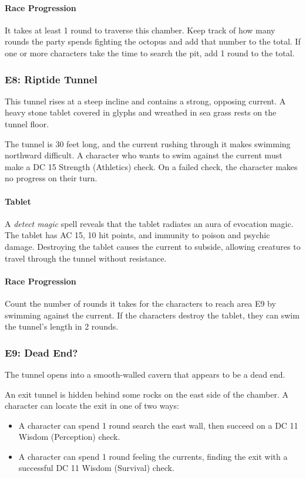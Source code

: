 \documentclass[10pt,a4,twoside,twocolumn,openany,nodeprecatedcode]{dndbook}
\begin{document}
\paragraph{Race Progression}
It takes at least 1 round to traverse this chamber. Keep track of how many rounds the party spends fighting the octopus and add that number to the total. If one or more characters take the time to search the pit, add 1 round to the total.
\subsubsection{E8: Riptide Tunnel}
\begin{DndReadAloud}{}
This tunnel rises at a steep incline and contains a strong, opposing current. A heavy stone tablet covered in glyphs and wreathed in sea grass rests on the tunnel floor.
\end{DndReadAloud}

The tunnel is 30 feet long, and the current rushing through it makes swimming northward difficult. A character who wants to swim against the current must make a DC 15 Strength (Athletics) check. On a failed check, the character makes no progress on their turn.
\paragraph{Tablet}
A \textit{detect magic} spell reveals that the tablet radiates an aura of evocation magic. The tablet has AC 15, 10 hit points, and immunity to poison and psychic damage. Destroying the tablet causes the current to subside, allowing creatures to travel through the tunnel without resistance.
\paragraph{Race Progression}
Count the number of rounds it takes for the characters to reach area E9 by swimming against the current. If the characters destroy the tablet, they can swim the tunnel's length in 2 rounds.
\subsubsection{E9: Dead End?}
\begin{DndReadAloud}{}
The tunnel opens into a smooth-walled cavern that appears to be a dead end.
\end{DndReadAloud}

An exit tunnel is hidden behind some rocks on the east side of the chamber. A character can locate the exit in one of two ways:
\begin{itemize}

\item A character can spend 1 round search the east wall, then succeed on a DC 11 Wisdom (Perception) check.
\item A character can spend 1 round feeling the currents, finding the exit with a successful DC 11 Wisdom (Survival) check.
\end{itemize}
\end{document}
